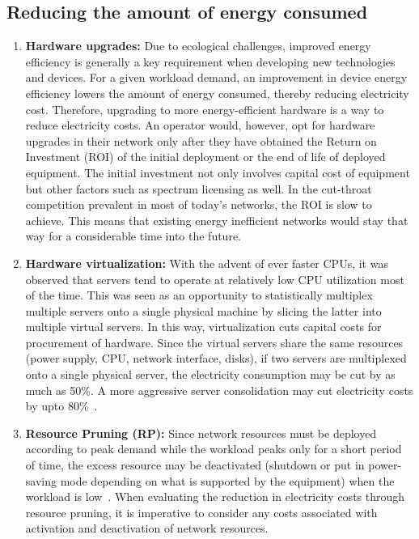 \subsection{Reducing the amount of energy consumed}
\begin{enumerate}
\item \textbf{Hardware upgrades:} Due to ecological challenges, improved energy efficiency is generally a key requirement when developing new technologies and devices. For a given workload demand, an improvement in device energy efficiency lowers the amount of energy consumed, thereby reducing electricity cost. Therefore, upgrading to more energy-efficient hardware is a way to reduce electricity costs. An operator would, however, opt for hardware upgrades in their network only after they have obtained the Return on Investment (ROI) of the initial deployment or the end of life of deployed equipment. The initial investment not only involves capital cost of equipment but other factors such as spectrum licensing as well. In the cut-throat competition prevalent in most of today's networks, the ROI is slow to achieve. This means that existing energy inefficient networks would stay that way for a considerable time into the future.
\item \textbf{Hardware virtualization:} With the advent of ever faster CPUs, it was observed that servers tend to operate at relatively low CPU utilization most of the time. This was seen as an opportunity to statistically multiplex multiple servers onto a single physical machine by slicing the latter into multiple virtual servers. In this way, virtualization cuts capital costs for procurement of hardware. Since the virtual servers share the same resources (power supply, CPU, network interface, disks), if two servers are multiplexed onto a single physical server, the electricity consumption may be cut by as much as 50\%. A more aggressive server consolidation may cut electricity costs by upto 80\%~\cite{VirtualizationCutsPower}.
\item \textbf{Resource Pruning (RP):} Since network resources must be deployed according to peak demand while the workload peaks only for a short period of time, the excess resource may be deactivated (shutdown or put in power-saving mode depending on what is supported by the equipment) when the workload is low~\cite{Chase:2001:MES:502059.502045,Chen:2008:ESP:1387589.1387613,Meisner:2009:PES:1508244.1508269,Lin_dynamicright-sizing,Peng:2011:TPS:2030613.2030628}. When evaluating the reduction in electricity costs through resource pruning, it is imperative to consider any costs associated with activation and deactivation of network resources.
\end{enumerate}

